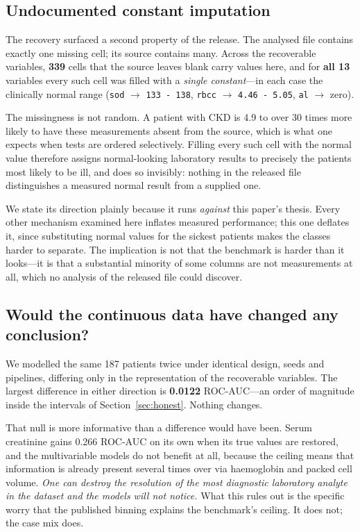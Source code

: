 \documentclass[conference]{IEEEtran}
\begin{document}
\subsection{Undocumented constant imputation}
\label{sec:imputation}

The recovery surfaced a second property of the release. The analysed file
contains exactly one missing cell; its source contains many. Across the
recoverable variables, \textbf{339} cells that the source leaves blank carry
values here, and for \textbf{all 13} variables every such cell was filled with
a \emph{single constant}---in each case the clinically normal range
(\texttt{sod} $\rightarrow$ \texttt{133 - 138}, \texttt{rbcc} $\rightarrow$
\texttt{4.46 - 5.05}, \texttt{al} $\rightarrow$ zero).

The missingness is not random. A patient with CKD is 4.9 to over 30 times more
likely to have these measurements absent from the source, which is what one
expects when tests are ordered selectively. Filling every such cell with the
normal value therefore assigns normal-looking laboratory results to precisely
the patients most likely to be ill, and does so invisibly: nothing in the
released file distinguishes a measured normal result from a supplied one.

We state its direction plainly because it runs \emph{against} this paper's
thesis. Every other mechanism examined here inflates measured performance;
this one deflates it, since substituting normal values for the sickest
patients makes the classes harder to separate. The implication is not that the
benchmark is harder than it looks---it is that a substantial minority of some
columns are not measurements at all, which no analysis of the released file
could discover.

\subsection{Would the continuous data have changed any conclusion?}

We modelled the same 187 patients twice under identical design, seeds and
pipelines, differing only in the representation of the recoverable variables.
The largest difference in either direction is \textbf{0.0122} ROC-AUC---an
order of magnitude inside the intervals of Section~\ref{sec:honest}. Nothing
changes.

That null is more informative than a difference would have been. Serum
creatinine gains 0.266 ROC-AUC on its own when its true values are restored,
and the multivariable models do not benefit at all, because the ceiling means
that information is already present several times over via haemoglobin and
packed cell volume. \emph{One can destroy the resolution of the most
diagnostic laboratory analyte in the dataset and the models will not notice.}
What this rules out is the specific worry that the published binning explains
the benchmark's ceiling. It does not; the case mix does.
\end{document}
